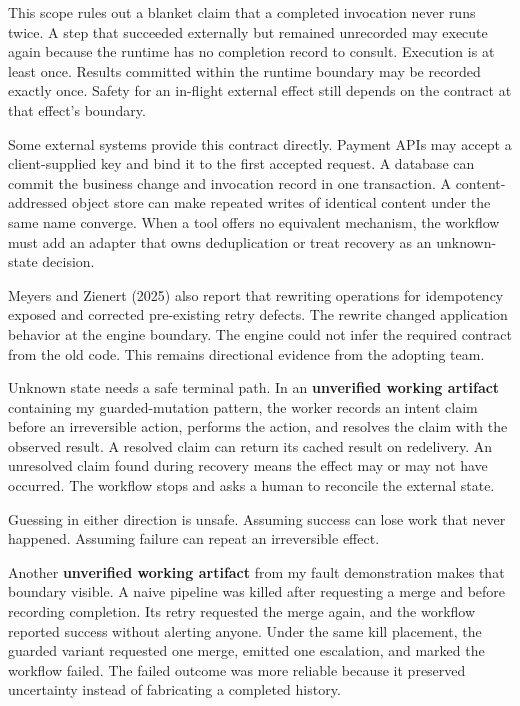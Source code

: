 This scope rules out a blanket claim that a completed invocation never runs twice. A step that succeeded externally but remained unrecorded may execute again because the runtime has no completion record to consult. Execution is at least once. Results committed within the runtime boundary may be recorded exactly once. Safety for an in-flight external effect still depends on the contract at that effect's boundary.

Some external systems provide this contract directly. Payment APIs may accept a client-supplied key and bind it to the first accepted request. A database can commit the business change and invocation record in one transaction. A content-addressed object store can make repeated writes of identical content under the same name converge. When a tool offers no equivalent mechanism, the workflow must add an adapter that owns deduplication or treat recovery as an unknown-state decision.

Meyers and Zienert (2025) also report that rewriting operations for idempotency exposed and corrected pre-existing retry defects. The rewrite changed application behavior at the engine boundary. The engine could not infer the required contract from the old code. This remains directional evidence from the adopting team.

Unknown state needs a safe terminal path. In an \textbf{unverified working artifact} containing my guarded-mutation pattern, the worker records an intent claim before an irreversible action, performs the action, and resolves the claim with the observed result. A resolved claim can return its cached result on redelivery. An unresolved claim found during recovery means the effect may or may not have occurred. The workflow stops and asks a human to reconcile the external state.

Guessing in either direction is unsafe. Assuming success can lose work that never happened. Assuming failure can repeat an irreversible effect.

Another \textbf{unverified working artifact} from my fault demonstration makes that boundary visible. A naive pipeline was killed after requesting a merge and before recording completion. Its retry requested the merge again, and the workflow reported success without alerting anyone. Under the same kill placement, the guarded variant requested one merge, emitted one escalation, and marked the workflow failed. The failed outcome was more reliable because it preserved uncertainty instead of fabricating a completed history.

